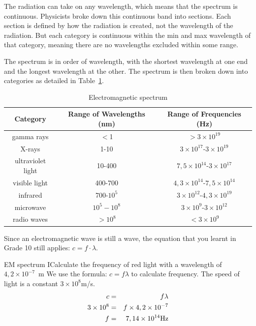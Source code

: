 The radiation can take on any wavelength, which means that the spectrum is continuous. Physicists broke down this continuous band into sections. Each section is defined by how the radiation is created, not the wavelength of the radiation. But each category is continuous within the min and max wavelength of that category, meaning there are no wavelengths excluded within some range. 

The spectrum is in order of wavelength, with the shortest wavelength at one end and the longest wavelength at the other. The spectrum is then broken down into categories as detailed in Table~\ref{tab:emspectrum}.

\begin{table}[H]
\begin{center}
\caption{Electromagnetic spectrum}
\label{tab:emspectrum}
\begin{tabular}{|c|c|c|}\hline
\textbf{Category}&\textbf{Range of Wavelengths (nm)}&\textbf{Range of Frequencies (Hz)}\\\hline\hline
gamma rays&$<$1&$>3\times 10^{19}$ \\\hline
X-rays&1-10&$3\times 10^{17}$-$3\times 10^{19}$\\\hline
ultraviolet light&10-400&$7,5\times 10^{14}$-$3\times 10^{17}$\\\hline
visible light&400-700&$4,3\times 10^{14}$-$7,5\times 10^{14}$\\\hline
infrared&700-$10^{5}$&$3\times 10^{12}$-$4,3\times 10^{19}$\\\hline
microwave&$10^{5}-10^{8}$&$3\times 10^{9}$-$3\times 10^{12}$\\\hline
radio waves&$>10^{8}$&$<3\times 10^{9}$\\\hline
\end{tabular}
\end{center}
\end{table}

Since an electromagnetic wave is still a wave, the equation that you learnt in Grade 10 still applies:
$c=f\cdot \lambda$.

\clearpage

\begin{wex}{EM spectrum I}{Calculate the frequency of red light with a wavelength of $4,2 \times 10^{-7}$~m}{ 
We use the formula: $c=f\lambda$ to calculate frequency. The speed of light is a constant $3 \times 10^{8}$m/s.
\begin{eqnarray*}
c&=&f\lambda\\
3 \times 10^{8}&=&f \times 4,2 \times 10^{-7} \\
f &=& 7,14 \times 10^{14} \rm {Hz}
\end{eqnarray*}}
\end{wex}


